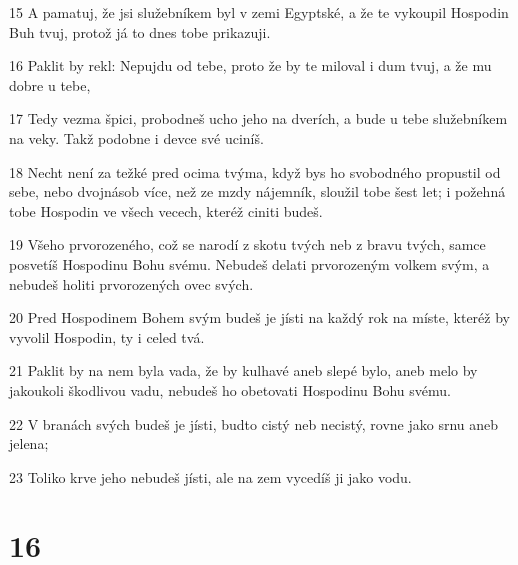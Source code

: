 \par 15 A pamatuj, že jsi služebníkem byl v zemi Egyptské, a že te vykoupil Hospodin Buh tvuj, protož já to dnes tobe prikazuji.
\par 16 Paklit by rekl: Nepujdu od tebe, proto že by te miloval i dum tvuj, a že mu dobre u tebe,
\par 17 Tedy vezma špici, probodneš ucho jeho na dverích, a bude u tebe služebníkem na veky. Takž podobne i devce své uciníš.
\par 18 Necht není za težké pred ocima tvýma, když bys ho svobodného propustil od sebe, nebo dvojnásob více, než ze mzdy nájemník, sloužil tobe šest let; i požehná tobe Hospodin ve všech vecech, kteréž ciniti budeš.
\par 19 Všeho prvorozeného, což se narodí z skotu tvých neb z bravu tvých, samce posvetíš Hospodinu Bohu svému. Nebudeš delati prvorozeným volkem svým, a nebudeš holiti prvorozených ovec svých.
\par 20 Pred Hospodinem Bohem svým budeš je jísti na každý rok na míste, kteréž by vyvolil Hospodin, ty i celed tvá.
\par 21 Paklit by na nem byla vada, že by kulhavé aneb slepé bylo, aneb melo by jakoukoli škodlivou vadu, nebudeš ho obetovati Hospodinu Bohu svému.
\par 22 V branách svých budeš je jísti, budto cistý neb necistý, rovne jako srnu aneb jelena;
\par 23 Toliko krve jeho nebudeš jísti, ale na zem vycedíš ji jako vodu.

\chapter{16}

